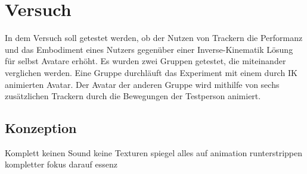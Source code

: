 \chapter{Versuch}
In dem Versuch soll getestet werden, ob der Nutzen von Trackern die Performanz und das Embodiment eines Nutzers gegenüber einer Inverse-Kinematik Lösung für selbst Avatare erhöht. Es wurden zwei Gruppen getestet, die miteinander verglichen werden. Eine Gruppe durchläuft das Experiment mit einem durch IK animierten Avatar. Der Avatar der anderen Gruppe wird mithilfe von sechs zusätzlichen Trackern durch die Bewegungen der Testperson animiert.

\section{Konzeption}
Komplett keinen Sound
keine Texturen
spiegel
alles auf animation runterstrippen 
kompletter fokus darauf
essenz


